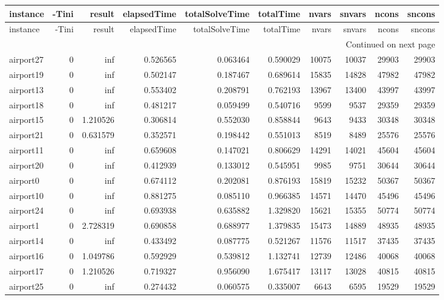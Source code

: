 \begin{longtable}{|l|r|r|r|r|r|r|r|r|r|}
\toprule
instance & -Tini & result & elapsedTime & totalSolveTime & totalTime & nvars & snvars & ncons & sncons \\
\midrule
\endfirsthead
\toprule
instance & -Tini & result & elapsedTime & totalSolveTime & totalTime & nvars & snvars & ncons & sncons \\
\midrule
\endhead
\midrule
\multicolumn{10}{r}{Continued on next page} \\
\midrule
\endfoot
\bottomrule
\endlastfoot
airport27 & 0 & inf & 0.526565 & 0.063464 & 0.590029 & 10075 & 10037 & 29903 & 29903 \\
airport19 & 0 & inf & 0.502147 & 0.187467 & 0.689614 & 15835 & 14828 & 47982 & 47982 \\
airport13 & 0 & inf & 0.553402 & 0.208791 & 0.762193 & 13967 & 13400 & 43997 & 43997 \\
airport18 & 0 & inf & 0.481217 & 0.059499 & 0.540716 & 9599 & 9537 & 29359 & 29359 \\
airport15 & 0 & 1.210526 & 0.306814 & 0.552030 & 0.858844 & 9643 & 9433 & 30348 & 30348 \\
airport21 & 0 & 0.631579 & 0.352571 & 0.198442 & 0.551013 & 8519 & 8489 & 25576 & 25576 \\
airport11 & 0 & inf & 0.659608 & 0.147021 & 0.806629 & 14291 & 14021 & 45604 & 45604 \\
airport20 & 0 & inf & 0.412939 & 0.133012 & 0.545951 & 9985 & 9751 & 30644 & 30644 \\
airport0 & 0 & inf & 0.674112 & 0.202081 & 0.876193 & 15819 & 15232 & 50367 & 50367 \\
airport10 & 0 & inf & 0.881275 & 0.085110 & 0.966385 & 14571 & 14470 & 45496 & 45496 \\
airport24 & 0 & inf & 0.693938 & 0.635882 & 1.329820 & 15621 & 15355 & 50774 & 50774 \\
airport1 & 0 & 2.728319 & 0.690858 & 0.688977 & 1.379835 & 15473 & 14889 & 48935 & 48935 \\
airport14 & 0 & inf & 0.433492 & 0.087775 & 0.521267 & 11576 & 11517 & 37435 & 37435 \\
airport16 & 0 & 1.049786 & 0.592929 & 0.539812 & 1.132741 & 12739 & 12486 & 40068 & 40068 \\
airport17 & 0 & 1.210526 & 0.719327 & 0.956090 & 1.675417 & 13117 & 13028 & 40815 & 40815 \\
airport25 & 0 & inf & 0.274432 & 0.060575 & 0.335007 & 6643 & 6595 & 19529 & 19529 \\

\end{longtable}

